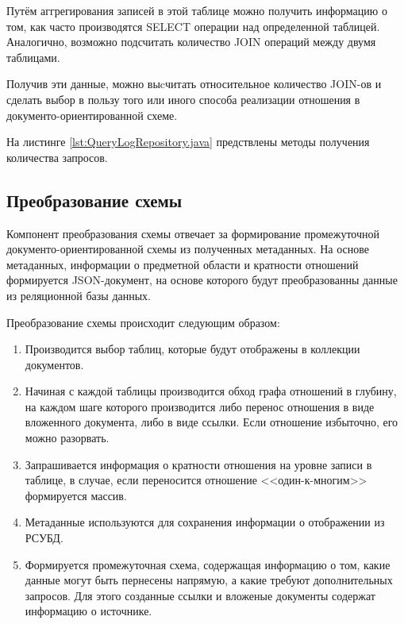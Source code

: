 Путём аггрегирования записей в этой таблице можно получить информацию о том, 
как часто производятся \textmd{SELECT} операции над определенной таблицей.
Аналогично, возможно подсчитать количество \textmd{JOIN} операций между двумя таблицами.

Получив эти данные, можно выcчитать относительное количество JOIN-ов и 
сделать выбор в пользу того или иного способа реализации отношения в документо-ориентированной схеме.

На листинге \ref{lst:QueryLogRepository.java} предствлены методы получения количества запросов.

\clearpage

\subsection{Преобразование схемы}

Компонент преобразования схемы отвечает за формирование промежуточной 
документо-ориентированной схемы из полученных метаданных. 
На основе метаданных, информации о предметной области и кратности отношений формируется JSON-документ,
на основе которого будут преобразованны данные из реляционной базы данных.

Преобразование схемы происходит следующим образом:
\begin{enumerate}
    \item Производится выбор таблиц, которые будут отображены в коллекции документов.
    \item Начиная с каждой таблицы производится обход графа отношений в глубину,
    на каждом шаге которого производится либо перенос отношения в виде вложенного документа,
    либо в виде ссылки. Если отношение избыточно, его можно разорвать.
    \item Запрашивается информация о кратности отношения на уровне записи в таблице,
    в случае, если переносится отношение <<один-к-многим>> формируется массив.
    \item Метаданные используются для сохранения информации о отображении из РСУБД.
    \item Формируется промежуточная схема, содержащая информацию о том, 
    какие данные могут быть пернесены напрямую, а какие требуют дополнительных запросов.
    Для этого созданные ссылки и вложеные документы содержат информацию о источнике.
\end{enumerate}

\clearpage

